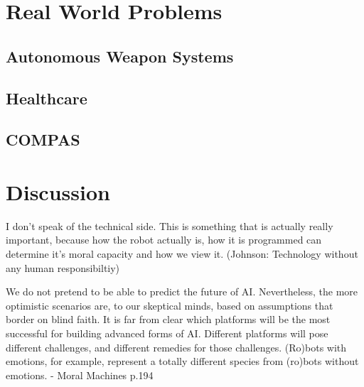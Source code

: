 \documentclass{article}
\newcounter{example}[section]
\begin{document}
%
%
%
%

\section{Real World Problems}
\subsection{Autonomous Weapon Systems}
\subsection{Healthcare}
\subsection{COMPAS}
\section{Discussion}

I don't speak of the technical side. This is something that is actually really
important, because how the robot actually is, how it is programmed can determine
it's moral capacity and how we view it. (Johnson: Technology without any human
responsibiltiy)


We do not pretend to be able to predict the future of AI. Nevertheless, the 
more optimistic scenarios are, to our skeptical minds, based on assumptions 
that border on blind faith. It is far from clear which platforms will be the most 
successful for building advanced forms of AI. Different platforms will pose 
different challenges, and different remedies for those challenges. (Ro)bots 
with emotions, for example, represent a totally different species from (ro)bots 
without emotions. - Moral Machines p.194
\end{document}
